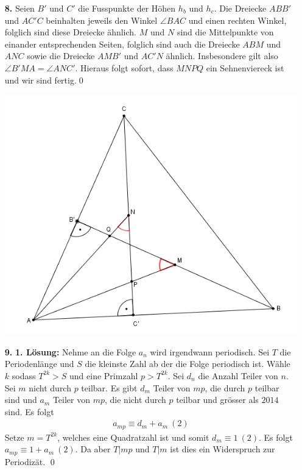 \documentclass[12pt,a4paper]{article}
\theoremstyle{plain}
\theoremstyle{definition}
\begin{document}
\begin{itemize}
\item[\textbf{8.}]
Seien $B'$ und $C'$ die Fusspunkte der Höhen $h_b$ und $h_c$. Die Dreiecke $ABB'$ und $AC'C$ beinhalten jeweils den Winkel $\angle BAC$ und einen rechten Winkel, folglich sind diese Dreiecke ähnlich. $M$ und $N$ sind die Mittelpunkte von einander entsprechenden Seiten, folglich sind auch die Dreiecke $ABM$ und $ANC$ sowie die Dreiecke $AMB'$ und $AC'N$ ähnlich. Insbesondere gilt also $\angle B'MA=\angle ANC'$. Hieraus folgt sofort, dass $MNPQ$ ein Sehnenviereck ist und wir sind fertig.\qed
\begin{center}\includegraphics{Finalrunde14_8.PNG}\end{center}

\item[\textbf{9.}]
\textbf{1. Lösung:} Nehme an die Folge $a_n$ wird irgendwann periodisch. Sei $T$ die Periodenlänge und $S$ die kleinste Zahl ab der die Folge periodisch ist. Wähle $k$ sodass $T^{2k}>S$ und eine Primzahl $p> T^{2k}$. Sei $d_n$ die Anzahl Teiler von $n$. Sei $m$ nicht durch $p$ teilbar. Es gibt $d_m$ Teiler von $mp$, die durch $p$ teilbar sind und $a_m$ Teiler von $mp$, die nicht durch $p$ teilbar und grösser als $2014$ sind. Es folgt
\begin{align*}
a_{mp}\equiv d_m+a_m \ (2)
\end{align*} 
Setze $m=T^{2k}$, welches eine Quadratzahl ist und somit $d_m \equiv 1 \ (2)$. Es folgt $a_{mp} \equiv 1 + a_m \ (2)$. Da aber $T | mp$ und $T | m$ ist dies ein Widerspruch zur Periodizät. \qed


\end{itemize}
\end{document}

